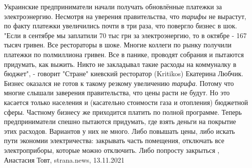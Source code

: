 Украинские предприниматели начали получать обновлённые платежки за
электроэнергию. Несмотря на уверения правительства, что \emph{тарифы} не вырастут, по
факту платежки увеличились почти в три раза, что повергло бизнес в шок.  "Если
в сентябре мы заплатили 70 тыс грн за электроэнергию, то в октябре - 167 тысяч
гривен. Все рестораторы в шоке. Многие коллеги по рынку получили платежки по
полмиллиона гривен. Все в панике, проводят собрания и пытаются придумать, как
выжить. Никто не закладывал такие расходы на коммуналку в бюджет", - говорит
"Стране" киевский ресторатор (Kritikos) Екатерина Любчик.  Бизнес оказался не
готов к такому резкому увеличению \emph{тарифа}. Потому что многие слышали заверения
правительства, что цены расти не будут. Но это касается только населения и
(касательно стоимости газа и отопления) бюджетной сферы.  Частному бизнесу же
приходится платить по полной программе.  Теперь предприниматели спешно пытаются
придумать, где взять деньги на покрытие этих расходов.  Вариантов у них не
много. Либо повышать цены, либо искать пути экономии электричества: закрывать
часть помещения, отключать все электроприборы, которые можно отключить. Либо
попросту закрыться
, 
Анастасия Товт, strana.news, 13.11.2021
